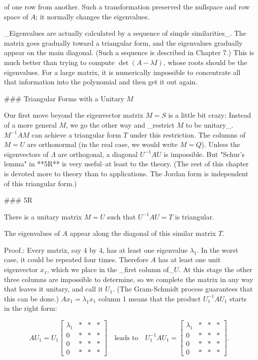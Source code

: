 of one row from another. Such a transformation preserved the nullspace and row space of \(A\); it normally changes the eigenvalues.

_Eigenvalues are actually calculated by a sequence of simple similarities_. The matrix goes gradually toward a triangular form, and the eigenvalues gradually appear on the main diagonal. (Such a sequence is described in Chapter 7.) This is much better than trying to compute \(\det(A-\lambda I)\), whose roots should be the eigenvalues. For a large matrix, it is numerically impossible to concentrate all that information into the polynomial and then get it out again.

### Triangular Forms with a Unitary \(M\)

Our first move beyond the eigenvector matrix \(M=S\) is a little bit crazy: Instead of a more general \(M\), we go the other way and _restrict \(M\) to be unitary_. \(M^{-1}AM\) can achieve a triangular form \(T\) under this restriction. The columns of \(M=U\) are orthonormal (in the real case, we would write \(M=Q\)). Unless the eigenvectors of \(\Lambda\) are orthogonal, a diagonal \(U^{-1}AU\) is impossible. But "Schur's lemma" in **5R** is very useful--at least to the theory. (The rest of this chapter is devoted more to theory than to applications. The Jordan form is independent of this triangular form.)

### 5R

There is a unitary matrix \(M=U\) such that \(U^{-1}AU=T\) is triangular.

The eigenvalues of \(A\) appear along the diagonal of this similar matrix \(T\).

Proof.: Every matrix, say 4 by 4, has at least one eigenvalue \(\lambda_{1}\). In the worst case, it could be repeated four times. Therefore \(A\) has at least one unit eigenvector \(x_{1}\), which we place in the _first column of_\(U\). At this stage the other three columns are impossible to determine, so we complete the matrix in any way that leaves it unitary, and call it \(U_{1}\). (The Gram-Schmidt process guarantees that this can be done.) \(Ax_{1}=\lambda_{1}x_{1}\) column 1 means that the product \(U_{1}^{-1}AU_{1}\) starts in the right form:

\[AU_{1}=U_{1}\begin{bmatrix}\lambda_{1}&*&*&*\\ 0&*&*&*\\ 0&*&*&*\\ 0&*&*&*\end{bmatrix}\quad\text{leads to}\quad U_{1}^{-1}AU_{1}=\begin{bmatrix} \lambda_{1}&*&*&*\\ 0&*&*&*\\ 0&*&*&*\\ 0&*&*&*\end{bmatrix}.\]

